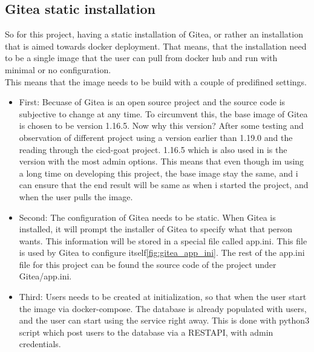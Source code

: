 \subsection{Gitea static installation}
So for this project, having a static installation of Gitea, or rather an installation that is aimed towards 
docker\cite{docker} deployment. That means, that the installation need to be a single image that the user can pull from 
docker hub and run with minimal or no configuration.\\
This means that the image needs to be build with a couple of predifined settings. 
\begin{itemize}
    \item First: Becuase of Gitea is an open source project and the source code is subjective to change at any time.
    To circumvent this, the base image of Gitea is chosen to be version 1.16.5. Now why this version? After some testing and
    observation of different project using a version earlier than 1.19.0 and the reading through the cicd-goat project\cite{cicd-goat}. 1.16.5 which is 
    also used in \cite{cicd-goat} is the version with the most admin options.
    This means that even though im using a long time on developing this project, the base image stay the same, and i 
    can ensure that the end result will be same as when i started the project, and when the user pulls the image.
    \item Second: The configuration of Gitea needs to be static. When Gitea is installed, it will prompt the installer of Gitea 
    to specify what that person wants. This information will be stored in a special file called app.ini. This file is 
    used by Gitea to configure itself\ref{fig:gitea_app_ini}. The rest of the app.ini file for this project
    can be found the source code of the project under Gitea/app.ini.
    \item Third: Users needs to be created at initialization, so that when the user start the image via docker-compose. 
    The database is already populated with users, and the user can start using the service right away.
    This is done with python3\cite{python} script which 
    post users to the database via a \ac{RESTAPI}, with admin credentials.
\end{itemize}

